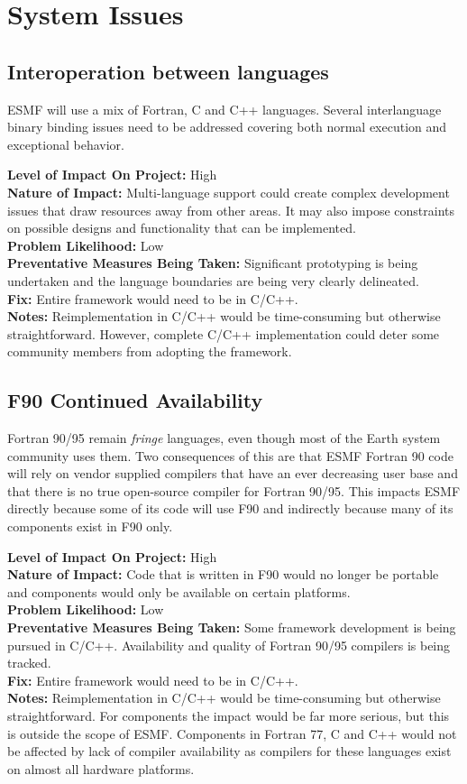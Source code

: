 \documentclass[english]{article}
\newcommand{\req}[1]{\section{\hspace{.2in}#1}}
\newcommand{\sreq}[1]{\subsection{\hspace{.2in}#1}}
\newenvironment
{reqlist}
{\begin{list} {} {} \rm \item[]}
{\end{list}}
\begin{document}
\req{System Issues}
\sreq{Interoperation between languages}
ESMF will use a mix of Fortran, C and C++ languages. Several interlanguage binary binding
issues need to be addressed covering both normal execution and exceptional
behavior.
\begin{reqlist}
{\bf Level of Impact On Project:} High \\
{\bf Nature of Impact:} Multi-language support could create complex development
issues that draw resources away from other areas. It may also impose constraints
on possible designs and functionality that can be implemented.
\\
{\bf Problem Likelihood:} Low\\
{\bf Preventative Measures Being Taken:} Significant prototyping is being undertaken and
the language boundaries are being very clearly delineated.\\
{\bf Fix:} Entire framework would need to be in C/C++.\\
{\bf Notes:} Reimplementation in C/C++ would be time-consuming but
otherwise straightforward. However, complete C/C++ implementation could deter
some community members from adopting the framework.
\end{reqlist}

\sreq{F90 Continued Availability}
Fortran 90/95 remain {\it fringe} languages, even though most of the Earth system
community uses them. Two consequences of this are that ESMF Fortran 90 code will
rely on vendor supplied compilers that have an ever decreasing user base and
that there is no true open-source compiler for Fortran 90/95.
This impacts ESMF directly because some of its code will use F90 and
indirectly because many of its components exist in F90 only.
\begin{reqlist}
{\bf Level of Impact On Project:} High \\
{\bf Nature of Impact:} Code that is written in F90 would no longer be portable
and components would only be available on certain platforms. \\
{\bf Problem Likelihood:} Low\\
{\bf Preventative Measures Being Taken:} Some framework development is being pursued in C/C++.
Availability and quality of Fortran 90/95 compilers
is being tracked.\\
{\bf Fix:} Entire framework would need to be in C/C++.\\
{\bf Notes:} Reimplementation in C/C++ would be time-consuming but
otherwise straightforward. For components the impact would be far more
serious, but this is outside the scope of ESMF.
Components in Fortran 77, C and C++ would not be affected by lack of 
compiler availability as compilers for these languages exist on almost all hardware platforms.
\end{reqlist}
\end{document}
